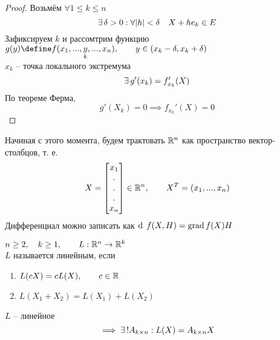 \begin{proof}
	Возьмём $ \forall 1 \le k \le n $
	$$ \exists\, \delta > 0 : \forall |h| < \delta \quad X + he_k \in E $$
	Зафиксируем $ k $ и рассомтрим функцию $ g(y) \define f(x_1, ..., \underset{k}y, ..., x_n), \qquad y \in (x_k - \delta, x_k + \delta) $ \\
	$ x_k $ -- точка локального экстремума
	$$ \exists\, g'(x_k) = f_{x_k}'(X) $$
	По теореме Ферма,
	$$ g'(X_k) = 0 \implies f_{x_k}'(X) = 0 $$
\end{proof}

Начиная с этого момента, будем трактовать $ \mathbb{R}^n $ как пространство вектор-столбцов, т. е.
$$ X =
\begin{bmatrix}
	x_1 \\
	. \\
	. \\
	. \\
	x_n
\end{bmatrix} \in \mathbb{R}^n, \qquad X^T = (x_1, ..., x_n) $$
Дифференциал можно записать как $ \di f(X, H) = \grad f(X) H $

\begin{definition}
	$ n \ge 2, \quad k \ge 1, \qquad L : \mathbb{R}^n \to \mathbb{R}^k $ \\
	$ L $ называется линейным, если
	\begin{enumerate}
		\item $ L(cX) = cL(X), \qquad c \in \mathbb{R} $
		\item $ L(X_1 + X_2) = L(X_1) + L(X_2) $
	\end{enumerate}
\end{definition}

\begin{theorem}
	$ L $ -- линейное
	$$ \implies \exists\,! A_{k \times n} : L(X) = A_{k \times n}X $$
\end{theorem}
